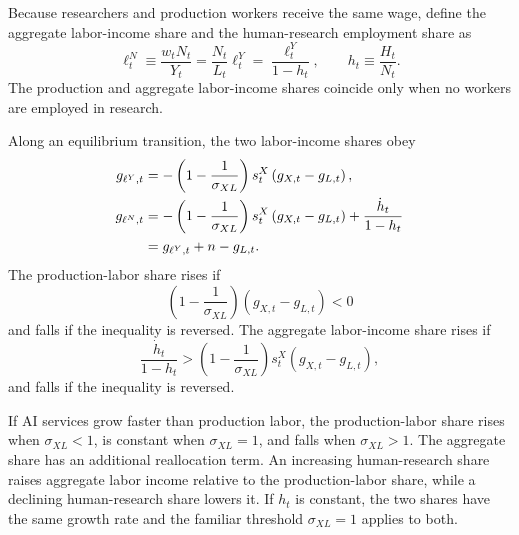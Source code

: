 Because researchers and production workers receive the same wage, define the
aggregate labor-income share and the human-research employment share as
\begin{equation}
    \ell^N_t
    \equiv
    \frac{w_tN_t}{Y_t}
    =
    \frac{N_t}{L_t}\ell^Y_t
    =
    \frac{\ell^Y_t}{1-h_t},
    \qquad
    h_t\equiv\frac{H_t}{N_t}.
    \label{eq:aggregate-labor-share}
\end{equation}
The production and aggregate labor-income shares coincide only when no workers are
employed in research.

\begin{proposition}
\label{prop:dynamic-labor-share}
Along an equilibrium transition, the two labor-income shares obey
\begin{align}
    g_{\ell^Y,t}
    &=
    -\left(1-\frac{1}{\sigma_{XL}}\right)s^X_t
    \left(g_{X,t}-g_{L,t}\right),
    \label{eq:dynamic-production-labor-share}\\
    g_{\ell^N,t}
    &=
    -\left(1-\frac{1}{\sigma_{XL}}\right)s^X_t
    \left(g_{X,t}-g_{L,t}\right)
    +
    \frac{\dot h_t}{1-h_t}
    \notag\\
    &=
    g_{\ell^Y,t}+n-g_{L,t}.
    \label{eq:dynamic-aggregate-labor-share}
\end{align}
The production-labor share rises if
\begin{equation}
    \left(1-\frac{1}{\sigma_{XL}}\right)
    \left(g_{X,t}-g_{L,t}\right)<0
    \label{eq:production-labor-share-rise-condition}
\end{equation}
and falls if the inequality is reversed. The aggregate labor-income share rises if
\begin{equation}
    \frac{\dot h_t}{1-h_t}
    >
    \left(1-\frac{1}{\sigma_{XL}}\right)s^X_t
    \left(g_{X,t}-g_{L,t}\right),
    \label{eq:aggregate-labor-share-rise-condition}
\end{equation}
and falls if the inequality is reversed.
\end{proposition}

If AI services grow faster than production labor, the production-labor share rises
when $\sigma_{XL}<1$, is constant when $\sigma_{XL}=1$, and falls when $\sigma_{XL}>1$. The
aggregate share has an additional reallocation term. An increasing human-research
share raises aggregate labor income relative to the production-labor share, while a
declining human-research share lowers it. If $h_t$ is constant, the two shares have
the same growth rate and the familiar threshold $\sigma_{XL}=1$ applies to both.

